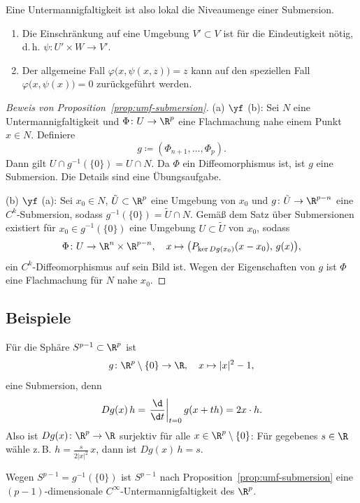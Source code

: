 \documentclass[11pt]{article}
\begin{document}
\begin{note}
  Eine Untermannigfaltigkeit ist also lokal die Niveaumenge einer Submersion.
\end{note}


\begin{note}
  \begin{enumerate}[label=(\roman*)]
    \item Die Einschränkung auf eine Umgebung $V' \subset V$ ist für die Eindeutigkeit nötig, d.\,h. $\psi\colon U' \times W \to V'$.
\item Der allgemeine Fall $\varphi\bigl(x, \psi(x, z)\bigr) = z$ kann auf den speziellen Fall $\varphi\bigl(x, \psi(x)\bigr) = 0$ zurückgeführt werden.
\end{enumerate}
\end{note}


\begin{proof}[Beweis von Proposition~\ref{prop:umf-submersion}]
  \glqq(a) $\yf$ (b)\grqq: Sei $N$ eine Untermannigfaltigkeit und $\Phi\colon U \to \R^p$ eine Flachmachung nahe einem Punkt $x \in N$. Definiere
  \[ g \coloneqq (\Phi_{n+1}, \dots, \Phi_p). \]
  Dann gilt $U \cap g^{-1}(\{0\}) = U \cap N$. Da $\Phi$ ein Diffeomorphismus ist, ist $g$ eine Submersion. Die Details sind eine Übungsaufgabe.


  \glqq(b) $\yf$ (a)\grqq: Sei $x_0 \in N$, $\tilde{U} \subset \R^p$ eine Umgebung von $x_0$ und $g\colon \tilde{U} \to \R^{p-n}$ eine $C^k$-Submersion, sodass $g^{-1}(\{0\}) = \tilde{U} \cap N$.
Gemäß dem Satz über Submersionen existiert für $x_0 \in g^{-1}(\{0\})$ eine Umgebung $U \subset \tilde{U}$ von $x_0$, sodass
  \[ \Phi\colon U \to \R^n \times \R^{p-n}, \quad x \mapsto \bigl(P_{\ker Dg(x_0)}(x - x_0),\, g(x)\bigr), \]
  ein $C^k$-Diffeomorphismus auf sein Bild ist.
Wegen der Eigenschaften von $g$ ist $\Phi$ eine Flachmachung für $N$ nahe $x_0$.
\end{proof}

\subsection{Beispiele}

\begin{example}[Sphäre]
  Für die Sphäre $S^{p-1} \subset \R^p$ ist
  \[ g\colon \R^p \setminus \{0\} \to \R, \quad x \mapsto \lvert x \rvert^2 - 1, \]
  eine Submersion, denn
  \[ Dg(x)\, h = \left.\frac{\d}{\d t}\right|_{t=0} g(x + th) = 2x \cdot h. \]
  Also ist $Dg(x)\colon \R^p \to \R$ surjektiv für alle $x \in \R^p \setminus \{0\}$: Für gegebenes $s \in \R$ wähle z.\,B. $h = \frac{s}{2\lvert x \rvert^2}\, x$, dann ist $Dg(x)\, h = s$.
\begin{ergaenzung}
  Wegen $S^{p-1} = g^{-1}(\{0\})$ ist $S^{p-1}$ nach Proposition~\ref{prop:umf-submersion} eine $(p-1)$-dimensionale $C^\infty$-Untermannigfaltigkeit des $\R^p$.
  \end{ergaenzung}
\end{example}
\end{document}

